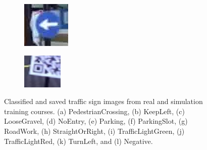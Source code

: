 \begin{figure}[h]
\begin{subfigure}[b]{0.15\linewidth}
    \caption{}
  \end{subfigure}
  \begin{subfigure}[b]{0.15\linewidth}
    \includegraphics[width=\linewidth]{figures/signs/TurnLeft.jpg}
    \caption{}
  \end{subfigure}
  \begin{subfigure}[b]{0.15\linewidth}
    \includegraphics[width=\linewidth]{figures/signs/Negative.jpg}
    \caption{}
  \end{subfigure}
  \caption[Auto-cropped traffic signs and lights]{Classified and saved traffic
    sign images from real and simulation training courses. (a)
    PedestrianCrossing, (b) KeepLeft, (c) LooseGravel, (d) NoEntry, (e)
    Parking, (f) ParkingSlot, (g) RoadWork, (h) StraightOrRight, (i)
    TrafficLightGreen, (j) TrafficLightRed, (k) TurnLeft, and (l) Negative.}
  \label{figure:traffic-sign-classes}
\end{figure}

